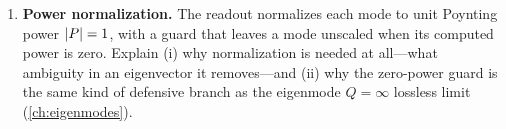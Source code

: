 \begin{enumerate}[nosep]
  which output of \emph{this} chapter supplies $\vs_i$, and which supplies the
  de-embedding phase inside $\sigma_{ij}$. Why must the boundary-mode analysis run
  \emph{before} the driven sweep rather than after?
  \item \textbf{Power normalization.} The readout normalizes each mode to unit
  Poynting power $\lvert P\rvert=1$, with a guard that leaves a mode unscaled when its
  computed power is zero. Explain (i) why normalization is needed at all---what
  ambiguity in an eigenvector it removes---and (ii) why the zero-power guard is the
  same kind of defensive branch as the eigenmode $Q=\infty$ lossless limit
  (\cref{ch:eigenmodes}).
\end{enumerate}
